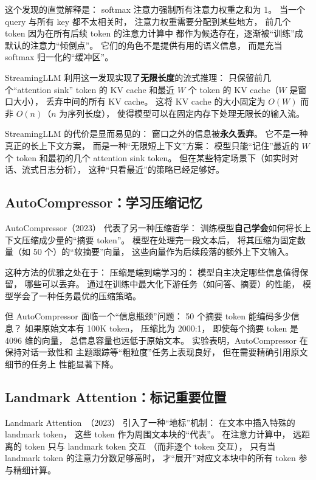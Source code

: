 这个发现的直觉解释是：
softmax 注意力强制所有注意力权重之和为 1。
当一个 query 与所有 key 都不太相关时，
注意力权重需要分配到某些地方，
前几个 token 因为在所有后续 token 的注意力计算中
都作为候选存在，逐渐被“训练”成
默认的注意力“倾倒点”。
它们的角色不是提供有用的语义信息，
而是充当 softmax 归一化的“缓冲区”。

StreamingLLM 利用这一发现实现了\textbf{无限长度}的流式推理：
只保留前几个“attention sink” token 的 KV cache
和最近 $W$ 个 token 的 KV cache（$W$ 是窗口大小），
丢弃中间的所有 KV cache。
这将 KV cache 的大小固定为 $O(W)$
而非 $O(n)$（$n$ 为序列长度），
使得模型可以在固定内存下处理无限长的输入流。

StreamingLLM 的代价是显而易见的：
窗口之外的信息被\textbf{永久丢弃}。
它不是一种真正的长上下文方案，
而是一种“无限短上下文”方案：
模型只能“记住”最近的 $W$ 个 token
和最初的几个 attention sink token。
但在某些特定场景下（如实时对话、流式日志分析），
这种“只看最近”的策略已经足够好。

\subsection{AutoCompressor：学习压缩记忆}

AutoCompressor（2023）%
代表了另一种压缩哲学：
训练模型\textbf{自己学会}如何将长上下文压缩成少量的“摘要 token”。
模型在处理完一段文本后，
将其压缩为固定数量（如 50 个）的“软摘要”向量，
这些向量作为后续段落的额外上下文输入。

这种方法的优雅之处在于：
压缩是端到端学习的：
模型自主决定哪些信息值得保留，
哪些可以丢弃。
通过在训练中最大化下游任务（如问答、摘要）的性能，
模型学会了一种任务最优的压缩策略。

但 AutoCompressor 面临一个“信息瓶颈”问题：
50 个摘要 token 能编码多少信息？
如果原始文本有 100K token，
压缩比为 2000:1，
即使每个摘要 token 是 4096 维的向量，
总信息容量也远低于原始文本。
实验表明，AutoCompressor 在保持对话一致性和
主题跟踪等“粗粒度”任务上表现良好，
但在需要精确引用原文细节的任务上
性能显著下降。

\subsection{Landmark Attention：标记重要位置}

Landmark Attention~\cite{mohtashami2023landmark}（2023）%
引入了一种“地标”机制：
在文本中插入特殊的 landmark token，
这些 token 作为周围文本块的“代表”。
在注意力计算中，
远距离的 token 只与 landmark token 交互
（而非逐个 token 交互），
只有当 landmark token 的注意力分数足够高时，
才“展开”对应文本块中的所有 token 参与精细计算。

